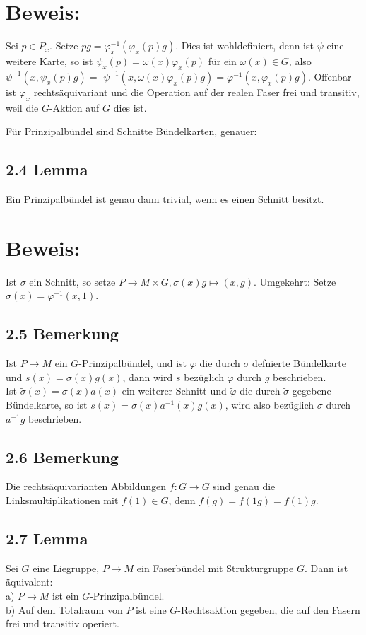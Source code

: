\section*{Beweis:}
Sei $p \in P_{x}$. Setze $p g=\varphi_{x}^{-1}\left(\varphi_{x}(p) g\right)$. Dies ist wohldefiniert, denn ist $\psi$ eine weitere Karte, so ist $\psi_{x}(p)=\omega(x) \varphi_{x}(p)$ für ein $\omega(x) \in G$, also $\psi^{-1}\left(x, \psi_{x}(p) g\right)=$ $\psi^{-1}\left(x, \omega(x) \varphi_{x}(p) g\right)=\varphi^{-1}\left(x, \varphi_{x}(p) g\right)$. Offenbar ist $\varphi_{x}$ rechtsäquivariant und die Operation auf der realen Faser frei und transitiv, weil die $G$-Aktion auf $G$ dies ist.

Für Prinzipalbündel sind Schnitte Bündelkarten, genauer:

\subsection*{2.4 Lemma}
Ein Prinzipalbündel ist genau dann trivial, wenn es einen Schnitt besitzt.

\section*{Beweis:}
Ist $\sigma$ ein Schnitt, so setze $P \rightarrow M \times G, \sigma(x) g \mapsto(x, g)$. Umgekehrt: Setze $\sigma(x)=\varphi^{-1}(x, 1)$.

\subsection*{2.5 Bemerkung}
Ist $P \rightarrow M$ ein $G$-Prinzipalbündel, und ist $\varphi$ die durch $\sigma$ defnierte Bündelkarte und $s(x)=\sigma(x) g(x)$, dann wird $s$ bezüglich $\varphi$ durch $g$ beschrieben.\\
Ist $\tilde{\sigma}(x)=\sigma(x) a(x)$ ein weiterer Schnitt und $\tilde{\varphi}$ die durch $\tilde{\sigma}$ gegebene Bündelkarte, so ist $s(x)=\tilde{\sigma}(x) a^{-1}(x) g(x)$, wird also bezüglich $\tilde{\sigma}$ durch $a^{-1} g$ beschrieben.

\subsection*{2.6 Bemerkung}
Die rechtsäquivarianten Abbildungen $f: G \rightarrow G$ sind genau die Linksmultiplikationen mit $f(1) \in G$, denn $f(g)=f(1 g)=f(1) g$.

\subsection*{2.7 Lemma}
Sei $G$ eine Liegruppe, $P \rightarrow M$ ein Faserbündel mit Strukturgruppe $G$. Dann ist äquivalent:\\
a) $P \rightarrow M$ ist ein $G$-Prinzipalbündel.\\
b) Auf dem Totalraum von $P$ ist eine $G$-Rechtsaktion gegeben, die auf den Fasern frei und transitiv operiert.

